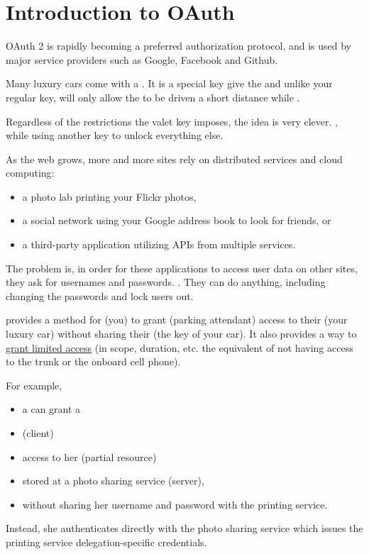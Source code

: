 \section{Introduction to OAuth}
OAuth 2 is rapidly becoming a preferred authorization protocol, and is used by major service providers such as Google, Facebook and Github. 


Many luxury cars come with a . 
It is a special key 
 give the
 and unlike your regular key, will only allow the 
to be driven a short distance while . 

Regardless of the restrictions the valet key imposes,
the idea is very clever. , while using another key to unlock everything else.

As the web grows, more and more sites rely on distributed services and
cloud computing: 
\begin{itemize}
\item
a photo lab printing your Flickr photos, 
\item
a social network
using your Google address book to look for friends, or 
\item
a third-party
application utilizing APIs from multiple services.
\end{itemize}

The problem is, in order for these applications to access user data
on other sites, they ask for usernames and passwords. . They can do
anything, including changing the passwords and lock users out.

\OAuth{} provides a method for  (you) 
to grant  (parking attendant) access to
their  (your luxury car)
without sharing their  (the key of your car). 
It also provides a way
to \underline{grant limited access} (in scope, duration, etc. the equivalent of
not having access to the trunk or the onboard cell phone).

For example, 
\begin{itemize}
\item
a  can grant a 
\item
{}
(client) 
\item
access to her  (partial resource) 
\item
stored at a photo sharing service
(server), 
\item
without sharing her username and password with the printing
service.  
\end{itemize}
Instead, she authenticates directly with the photo sharing
service which issues the printing service 
delegation-specific credentials.

